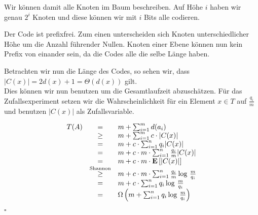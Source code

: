 \documentclass[11pt,a4paper,ngerman]{article}
\newcommand{\erw}[1]{\text{\bfseries E} \left[ #1 \right]}
\begin{document}
Wir können damit alle Knoten im Baum beschreiben. Auf Höhe $i$ haben wir genau $2^i$ Knoten und diese können wir mit $i$ Bits alle codieren.

Der Code ist prefixfrei. Zum einen unterscheiden sich Knoten unterschiedlicher Höhe um die Anzahl führender Nullen. Knoten einer Ebene können nun kein Prefix von einander sein, da die Codes alle die selbe Länge haben.

Betrachten wir nun die Länge des Codes, so sehen wir, dass $|C(x)| = 2d(x) + 1 = \Theta(d(x))$ gilt.\\

Dies können wir nun benutzen um die Gesamtlaufzeit abzuschätzen. Für das Zufallsexperiment setzen wir die Wahrscheinlichkeit für ein Element $x \in T$ auf $\frac{q_i}{m}$ und benutzen $|C(x)|$ als Zufallsvariable.

$$\begin{array}{rcl}
	T(A) 	&=&  m + \sum_{i=1}^m d(a_i)\\
		&\geq& m + \sum_{i=1}^m c \cdot |C(x)|\\
		&=& m + c \cdot \sum_{i=1}^n q_i |C(x)|\\
		&=& m + c \cdot m \cdot \sum_{i=1}^n \frac{q_i}{m} |C(x)|\\
		&=& m + c \cdot m \cdot \erw{|C(x)|}\\
		&\stackrel{\text{Shannon}}{\geq}&
			m + c \cdot m \cdot \sum_{i=1}^n  \frac{q_i}{m} \log \, \frac{m}{q_i}\\
		&=& m + c \cdot \sum_{i=1}^n q_i \log \, \frac{m}{q_i}\\
		&=& \Omega \left( m + \sum_{i=1}^n q_i \log \, \frac{m}{q_i} \right)
\end{array}$$

\mbox{}\hfill$\square$

\label{LastPage}
\end{document}
